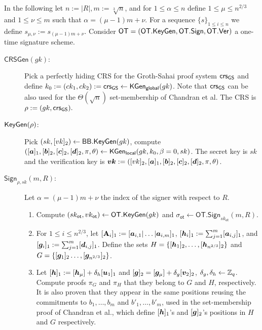 
In the following let $n:=|R|, m:=\sqrt[3]{n}$, and for $1\leq \alpha\leq n$ define $1\leq \mu \leq n^{2/3}$ and $1\leq \nu\leq m$ such that $\alpha=(\mu-1)m+\nu$. For a sequence $\{s\}_{1\leq i\leq n}$ we define $s_{\mu,\nu}:=s_{(\mu-1)m+\nu}$. Consider $\mathsf{OT}=(\mathsf{OT}.\mathsf{KeyGen},\mathsf{OT}.\mathsf{Sign},\allowbreak\mathsf{OT}.\mathsf{Ver})$ a one-time signature scheme.

\begin{description}
\item[$\mathsf{CRSGen}(gk)$:] Pick a perfectly hiding CRS for the Groth-Sahai proof system $\mathsf{crs}_{\mathsf{GS}}$ and define $k_0 := (ck_1,ck_2):=\mathsf{crs}_{\mathsf{GS}}\gets\mathsf{KGen}_{\mathsf{global}}(gk)$. Note that $\mathsf{crs}_{\mathsf{GS}}$ can be also used for the $\Theta(\sqrt{n})$ set-membership of Chandran et al. The CRS is $\rho:=(gk,\mathsf{crs}_{\mathsf{GS}}).$

\item[$\mathsf{KeyGen}(\rho)$:] Pick $(sk,[vk]_2)\gets\mathsf{BB}.\mathsf{KeyGen}(gk)$, compute $([{\boldsymbol{a}}]_1,[{\boldsymbol{b}}]_2,[{\boldsymbol{c}}]_2,[{\boldsymbol{d}}]_2,\pi,\theta)\allowbreak\gets\mathsf{KGen}_{\mathsf{local}}(gk,k_0,\beta = 0, sk)$. The secret key is $sk$ and the verification key is ${\boldsymbol{vk}}:=([vk]_2,[{\boldsymbol{a}}]_1,[{\boldsymbol{b}}]_2,[{\boldsymbol{c}}]_2,[{\boldsymbol{d}}]_2,\pi,\theta)$.

\item[$\mathsf{Sign}_{\rho,sk}(m,R)$:] Let $\alpha=(\mu-1)m+\nu$ the index of the signer with respect to $R$.
\begin{enumerate}
\item Compute $(sk_\mathsf{ot},vk_\mathsf{ot})\gets\mathsf{OT}.\mathsf{KeyGen}(gk)$ and $\sigma_\mathsf{ot}\gets\allowbreak\mathsf{OT}.\allowbreak\mathsf{Sign}_{sk_\mathsf{ot}}(m,R)$.

\item For $1\leq i \leq n^{2/3}$, let $[\mathbf{{A}}_i]_1:=[{\boldsymbol{a}}_{i,1}|\allowbreak\ldots|\allowbreak{\boldsymbol{a}}_{i,m}]_1$, $[{\boldsymbol{h}}_i]_1 := \sum_{j=1}^m[{\boldsymbol{a}}_{i,j}]_1$, and $[{\boldsymbol{g}}_i]_1:=\sum_{j=1}^{m}[{\boldsymbol{d}}_{i,j}]_1$. Define the sets
$H=\{[{\boldsymbol{h}}_1]_2,\ldots,[{\boldsymbol{h}}_{n^{2/3}}]_2\}$ and
$G=\{
	[{\boldsymbol{g}}_1]_2
	\allowbreak\ldots,\allowbreak
	[{\boldsymbol{g}}_{n^{2/3}}]_2\}$.

\item Let $[{\boldsymbol{h}}]_1:=[{\boldsymbol{h}}_\mu]+\delta_h[{\boldsymbol{u}}_1]_1$ and $[{\boldsymbol{g}}]_2=[{\boldsymbol{g}}_\mu]+\delta_g[{\boldsymbol{v}}_2]_2$, $\delta_g,\delta_h\gets\mathbb{Z}_q$. Compute proofs $\pi_G$ and $\pi_H$ that they belong to $G$ and $H$, respectively. It is also proven that they appear in the same positions reusing the commitments to $b_1,\ldots,b_{m}$ and $b'_1,\ldots,b'_{m}$, used in the set-membership proof of Chandran et al., which define $[{\boldsymbol{h}}]_1$'s and $[{\boldsymbol{g}}]_2$'s positions in $H$ and $G$ respectively.


\end{enumerate}
\end{description}

